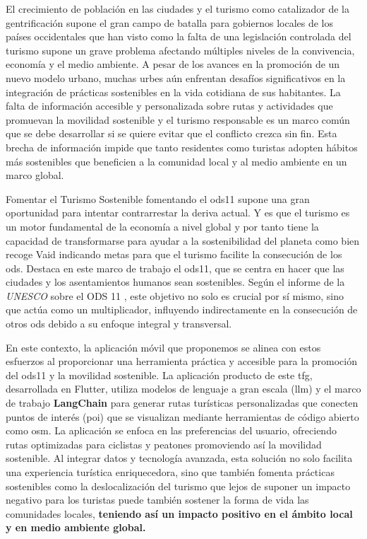 

El crecimiento de población en las ciudades \cite{nieuwenhuijsen_urban_2020} y el turismo como catalizador de la gentrificación supone el gran campo de batalla para gobiernos locales de los países occidentales que han visto como la falta de una legislación controlada del turismo supone un grave problema afectando múltiples niveles de la convivencia, economía y el medio ambiente. A pesar de los avances en la promoción de un nuevo modelo urbano, muchas urbes aún enfrentan desafíos significativos en la integración de prácticas sostenibles en la vida cotidiana de sus habitantes. La falta de información accesible y personalizada sobre rutas y actividades que promuevan la movilidad sostenible y el turismo responsable es un marco común que se debe desarrollar si se quiere evitar que el conflicto crezca sin fin. Esta brecha de información impide que tanto residentes como turistas adopten hábitos más sostenibles que beneficien a la comunidad local y al medio ambiente en un marco global.

Fomentar el Turismo Sostenible fomentando el \acrfull{ods11} supone una gran oportunidad para intentar contrarrestar la deriva actual. Y es que el turismo es un motor fundamental de la economía a nivel global y por tanto tiene la capacidad de transformarse para ayudar a la sostenibilidad del planeta como bien recoge Vaid \cite{vaid_sustainable_2024-1} indicando metas para que el turismo facilite la consecución de los \acrfull{ods}. Destaca en este marco de trabajo el \acrshort{ods11}, que se centra en hacer que las ciudades y los asentamientos humanos sean sostenibles. Según el informe de la \textit{UNESCO} sobre el ODS 11 \cite{ionescu_progress_2024}, este objetivo no solo es crucial por sí mismo, sino que actúa como un multiplicador, influyendo indirectamente en la consecución de otros \acrshort{ods} debido a su enfoque integral y transversal.

En este contexto, la aplicación móvil que proponemos se alinea con estos esfuerzos al proporcionar una herramienta práctica y accesible para la promoción del \acrfull{ods11} y la movilidad sostenible. La aplicación producto de este \acrshort{tfg}, desarrollada en Flutter, utiliza modelos de lenguaje a gran escala (\acrfull{llm}) y el marco de trabajo \textbf{LangChain} para generar rutas turísticas personalizadas que conecten puntos de interés (\acrfull{poi}) que se visualizan mediante herramientas de código abierto como \acrfull{osm}. La aplicación se enfoca en las preferencias del usuario, ofreciendo rutas optimizadas para ciclistas y peatones promoviendo así la movilidad sostenible. Al integrar datos y tecnología avanzada, esta solución no solo facilita una experiencia turística enriquecedora, sino que también fomenta prácticas sostenibles como la deslocalización del turismo que lejos de suponer un impacto negativo para los turistas \cite{mitas_tell_2023} puede también sostener la forma de vida las comunidades locales, \textbf{teniendo así un impacto positivo en el ámbito local y en medio ambiente global.}


